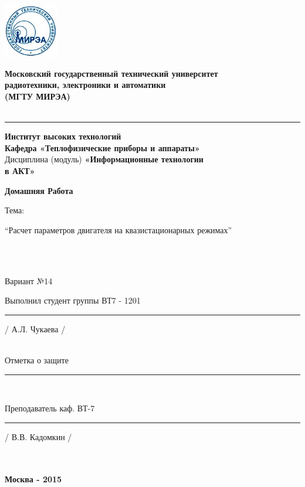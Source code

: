 \documentclass{article}
\begin{document}
\includegraphics[width=2.4cm]{mirea} 
\begin{center}
\begin{LARGE}
\textbf{Московский государственный технический университет}\\
\textbf{радиотехники, электроники и автоматики}\\
\textbf{(МГТУ МИРЭА)} \\
~\\
\hrule \vspace {10pt}
\textbf{Институт высоких технологий} \\

\textbf{Кафедра «Теплофизические приборы и аппараты»} \\
Дисциплина (модуль) \textbf{«Информационные технологии\\
в АКТ»} \\
\end{LARGE}
\begin{Huge}
\textbf{Домашняя Работа}\\
\end{Huge}
\begin{large}
Тема: 
\end{large}
\begin{normalsize}
“Расчет параметров двигателя на квазистационарных режимах” \\
\end{normalsize}
~\\
~\\
\begin{large}
Вариант №14\\

\end{large}
\end{center}
\begin{flushright}
Выполнил студент группы ВТ7 - 1201\\
\rule{4cm}{0.01pt} / А.Л. Чукаева / \\
~\\
\end{flushright}
\begin{flushleft}
Отметка о защите \rule{5cm}{0.01pt} \\
\end{flushleft}
\begin{flushright}

Преподаватель каф. ВТ-7 \\
\rule{4cm}{0.01pt} / В.В. Кадомкин / \\
~\\
~\\
\end{flushright}
\begin{center}
\textbf{Москва - 2015}
\end{center}
\end{document}
